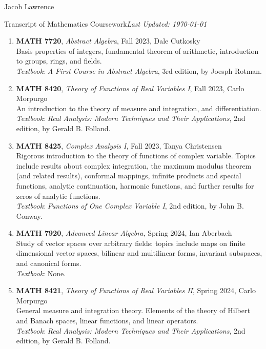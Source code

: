 \documentclass{article}
\begin{document}
\huge Jacob Lawrence

\large Transcript of Mathematics Coursework\hfill \normalsize \textit{Last Updated: \today}

\begin{enumerate}[leftmargin=*]
    \item[] \textbf{MATH 7720}, \textit{Abstract Algebra}, Fall 2023, Dale Cutkosky \\ 
    Basis properties of integers, fundamental theorem of arithmetic, introduction to groups, rings, and fields.\\
    \textit{Textbook}: \textit{A First Course in Abstract Algebra}, 3rd edition, by Joesph Rotman.  

    \item[] \textbf{MATH 8420}, \textit{Theory of Functions of Real Variables I}, Fall 2023, Carlo Morpurgo\\
    An introduction to the theory of measure and integration, and differentiation.  \\
    \textit{Textbook}: \textit{Real Analysis: Modern Techniques and Their Applications}, 2nd edition, by Gerald B. Folland. 

    \item[] \textbf{MATH 8425}, \textit{Complex Analysis I}, Fall 2023, Tanya Christensen\\
    Rigorous introduction to the theory of functions of complex variable. Topics include results about complex integration, the maximum modulus theorem (and related results), conformal mappings, infinite products and special functions, analytic continuation, harmonic functions, and further results for zeros of analytic functions. \\
    \textit{Textbook}: \textit{Functions of One Complex Variable I}, 2nd edition, by John B. Conway. 
    
    \item[] \textbf{MATH 7920}, \textit{Advanced Linear Algebra}, Spring 2024, Ian Aberbach\\
    Study of vector spaces over arbitrary fields: topics include maps on finite dimensional vector spaces, bilinear and multilinear forms, invariant subspaces, and canonical forms. \\
    \textit{Textbook}: None.  

    \item[] \textbf{MATH 8421}, \textit{Theory of Functions of Real Variables II}, Spring 2024, Carlo Morpurgo \\
    General measure and integration theory. Elements of the theory of Hilbert and Banach spaces, linear functions, and linear operators. \\
    \textit{Textbook}: \textit{Real Analysis: Modern Techniques and Their Applications}, 2nd edition, by Gerald B. Folland. 


\end{enumerate}
\end{document}
